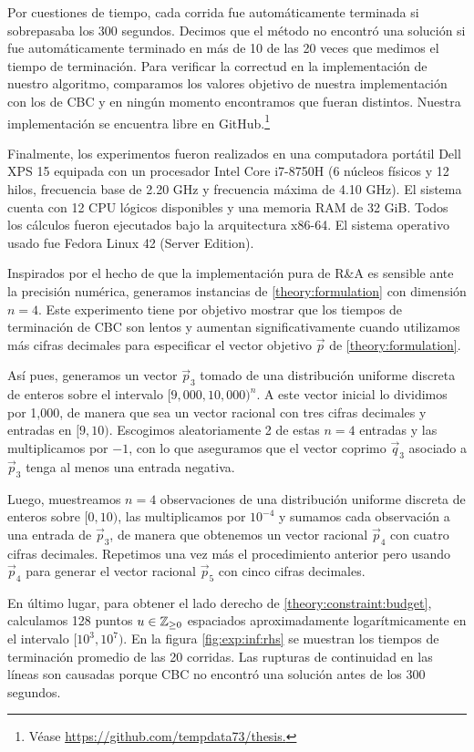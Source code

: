Por cuestiones de tiempo, cada corrida fue automáticamente terminada si sobrepasaba los 300
segundos. Decimos que el método no encontró una solución si fue automáticamente terminado en más de
10 de las 20 veces que medimos el tiempo de terminación. Para verificar la correctud en la
implementación de nuestro algoritmo, comparamos los valores objetivo de nuestra implementación con
los de CBC y en ningún momento encontramos que fueran distintos. Nuestra implementación se encuentra
libre en GitHub.\footnote{Véase \url{https://github.com/tempdata73/thesis.}}

Finalmente, los experimentos fueron realizados en una computadora portátil Dell XPS 15 equipada con
un procesador Intel Core i7-8750H (6 núcleos físicos y 12 hilos, frecuencia base de 2.20 GHz y
frecuencia máxima de 4.10 GHz). El sistema cuenta con 12 CPU lógicos disponibles y una memoria RAM
de 32 GiB. Todos los cálculos fueron ejecutados bajo la arquitectura x86-64. El sistema operativo
usado fue Fedora Linux 42 (Server Edition).

Inspirados por el hecho de que la implementación pura de R\&A es sensible ante la precisión
numérica, generamos instancias de \eqref{theory:formulation} con dimensión $n = 4$. Este experimento
tiene por objetivo mostrar que los tiempos de terminación de CBC son lentos y aumentan
significativamente cuando utilizamos más cifras decimales para especificar el vector objetivo
$\vec{p}$ de \eqref{theory:formulation}.

Así pues, generamos un vector $\vec{p}_3$ tomado de una distribución uniforme discreta de enteros sobre el
intervalo $[9{,}000, 10{,}000)^n$. A este vector inicial lo dividimos por 1{,}000, de manera que sea
un vector racional con tres cifras decimales y entradas en $[9, 10)$. Escogimos aleatoriamente 2 de
estas $n = 4$ entradas y las multiplicamos por $-1$, con lo que aseguramos que el vector coprimo
$\vec{q}_3$ asociado a $\vec{p}_3$ tenga al menos una entrada negativa.

Luego, muestreamos $n = 4$ observaciones de una distribución uniforme discreta de enteros sobre $[0,
10)$, las multiplicamos por $10^{-4}$ y sumamos cada observación a una entrada de $\vec{p}_3$, de
manera que obtenemos un vector racional $\vec{p}_4$ con cuatro cifras decimales. Repetimos una vez
más el procedimiento anterior pero usando $\vec{p}_4$ para generar el vector racional $\vec{p}_5$
con cinco cifras decimales.

En último lugar, para obtener el lado derecho de \eqref{theory:constraint:budget}, calculamos 128
puntos $u \in \mathbb{Z}_{\geq 0}$ espaciados aproximadamente logarítmicamente en el intervalo $[10^3,
10^7)$. En la figura \ref{fig:exp:inf:rhs} se muestran los tiempos de terminación promedio de las 20
corridas. Las rupturas de continuidad en las líneas son causadas porque CBC no encontró una
solución antes de los 300 segundos.

